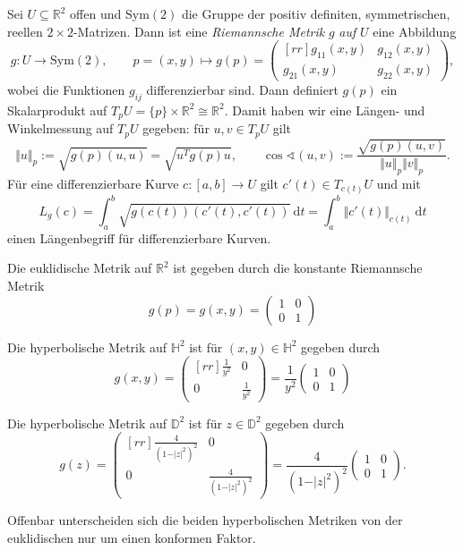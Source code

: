 \documentclass[11pt]{book}
\numberwithin{dummy}{section}
\theoremstyle{nonumberbreak}
\newenvironment{defin}[1][]{\ifthenelse{\equal{#1}{}}{\definition}{\definition[#1]}\rm}{\enddefinition}
\newenvironment{ex}[1][]{\ifthenelse{\equal{#1}{}}{\example}{\example[#1]}\rm}{\endexample}
\newcommand{\R}{\mathbb{R}}
\newcommand{\He}{\mathbb{H}}
\newcommand{\D}{\mathbb{D}}
\newcommand{\la}{\longrightarrow}
\begin{document}
\begin{spacing}{1.4}
\begin{defin}
Sei $U \subseteq \R^2$ offen und $\mathrm{Sym}(2)$ die Gruppe der positiv definiten, symmetrischen, reellen $2\times2$-Matrizen. Dann ist eine \textit{Riemannsche Metrik} $g$ \textit{auf} $U$ eine Abbildung
$$g: U \la \mathrm{Sym}(2), \qquad p=(x,y) \mapsto g(p) = \begin{pmatrix}[rr] g_{11}(x,y) & g_{12}(x,y)\\[-6pt] g_{21}(x,y) & g_{22}(x,y) \end{pmatrix},$$
wobei die Funktionen $g_{ij}$ differenzierbar sind. Dann definiert $g(p)$ ein Skalarprodukt auf $T_pU=\{p\} \times \R^2 \cong \R^2$. Damit haben wir eine Längen- und Winkelmessung auf $T_pU$ gegeben: für $u,v \in T_pU$ gilt
$$\Vert u \Vert_p := \sqrt{ g(p)(u,u)} = \sqrt{u^{T} g(p) u}, \qquad \cos \sphericalangle (u,v) := \frac{\sqrt{ g(p)(u,v)}}{\Vert u \Vert_p \Vert v\Vert_p}.$$
Für eine differenzierbare Kurve $c:[a,b] \la U$ gilt $c'(t) \in T_{c(t)}U$ und mit
$$L_g(c) = \int_a^b \sqrt{ g(c(t))(c'(t), c'(t))} \ \mathrm{d} t = \int_a^b \Vert c'(t) \Vert_{c(t)} \ \mathrm{d}t
$$
einen Längenbegriff für differenzierbare Kurven.

\begin{ex}
\begin{compactenum}
\item Die euklidische Metrik auf $\R^2$ ist gegeben durch die konstante Riemannsche Metrik 
$$g(p) = g(x,y) = \begin{pmatrix}1&0\\[-6pt] 0&1 \end{pmatrix}$$
\item Die hyperbolische Metrik auf $\He^2$ ist für $(x,y) \in \He^2$ gegeben durch 
$$g(x,y) = \begin{pmatrix}[rr] \frac{1}{y^2} & 0 \\[-6pt] 0 &\frac{1}{y^2} \end{pmatrix} = \frac{1}{y^2} \begin{pmatrix}1&0\\[-6pt] 0&1 \end{pmatrix}$$
\item Die hyperbolische Metrik auf $\D^2$ ist für $z\in \D^2$ gegeben durch 
$$g(z) = \begin{pmatrix}[rr] \frac{4}{(1-\vert z \vert^2)^2} & 0 \\[-6pt] 0 & \frac{4}{(1-\vert z \vert^2)^2} \end{pmatrix} = \frac{4}{(1-\vert z \vert^2)^2} \begin{pmatrix}1&0\\[-6pt] 0&1 \end{pmatrix}.$$
\end{compactenum}
Offenbar unterscheiden sich die beiden hyperbolischen Metriken von der euklidischen nur um einen konformen Faktor.
\end{ex}



\end{defin}
\end{spacing}
\end{document}
